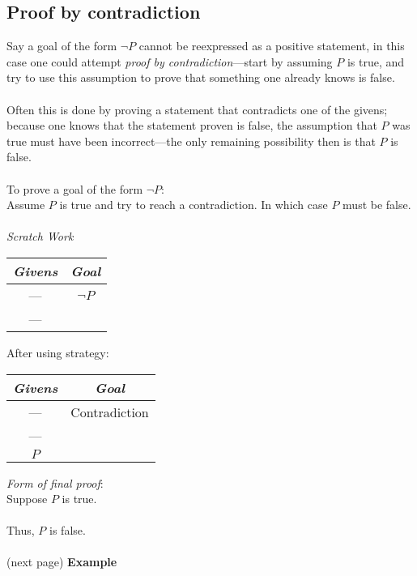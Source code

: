\documentclass{report}
\begin{document}
\subsection{Proof by contradiction}
Say a goal of the form $\neg P$ cannot be reexpressed as a positive statement, in this case one could attempt \textit{proof by contradiction}---start by assuming $P$ is true, and try to use this
assumption to prove that something one already knows is false.\\
\vspace{1mm}\\
Often this is done by proving a statement that contradicts one of the givens; because one knows that the statement proven is false, the assumption that $P$ was true must have been incorrect---the
only remaining possibility then is that $P$ is false.\\
\vspace{1mm}\\
\indent To prove a goal of the form $\neg P$:\\
\indent Assume $P$ is true and try to reach a contradiction. In which case $P$ must be false.\\
\vspace{1mm}\\
\textit{Scratch Work}
\begin{center}
\begin{tabular}{c|c}
\textit{Givens}&\textit{Goal}\\
\hline
---&$\neg P$\\
---&
\end{tabular}
\end{center}
After using strategy:
\begin{center}
\begin{tabular}{c|c}
\textit{Givens}&\textit{Goal}\\
\hline
---&Contradiction\\
---&\\
$P$&
\end{tabular}
\end{center}
\textit{Form of final proof}:\\
\indent Suppose $P$ is true.\\
\indent{}\\
\indent Thus, $P$ is false.\\
\vspace{1mm}\\
(next page)\newpage
\noindent\textbf{Example}\\
\end{document}
